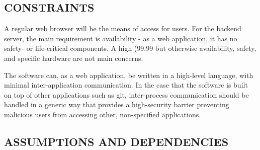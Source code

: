 \documentclass[letterpaper, 10pt, draftclsnofoot, onecolumn]{IEEEtran}
\begin{document}

\subsection[CONSTRAINTS]{\rmfamily\bfseries\color{black}
CONSTRAINTS}

\noindent A regular web browser will be the means of access for users. For the backend
server, the main requirement is availability - as a web application, it has no
safety- or life-critical components. A high (99.99%
but otherwise availability, safety, and specific hardware are not main concerns.

\bigskip

\noindent The software can, as a web application, be written in a high-level language, with
minimal inter-application communication. In the case that the software is built
on top of other applications such as git, inter-process communication should be
handled in a generic way that provides a high-security barrier preventing malicious
users from accessing other, non-specified applications.

\subsection[ASSUMPTIONS AND DEPENDENCIES]{\rmfamily\bfseries\color{black}
ASSUMPTIONS AND DEPENDENCIES}
\end{document}
